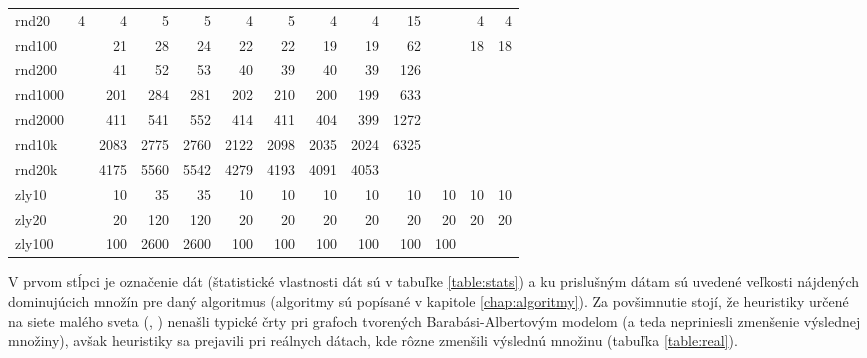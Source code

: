 \begin{landscape}
\begin{table}[h]
{\begin{tabular}{l|rrrrrrrrrrrr}
		rnd20   & 4     & 4      & 5       & 5        & 4        & 5        & 4       & 4      & 15         &            & 4      & 4       \\
		rnd100  &       & 21     & 28      & 24       & 22       & 22       & 19      & 19     & 62         &            & 18     & 18      \\
		rnd200  &       & 41     & 52      & 53       & 40       & 39       & 40      & 39     & 126        &            &        &         \\
		rnd1000 &       & 201    & 284     & 281      & 202      & 210      & 200     & 199    & 633        &            &        &         \\
		rnd2000 &       & 411    & 541     & 552      & 414      & 411      & 404     & 399    & 1272       &            &        &         \\
		rnd10k  &       & 2083   & 2775    & 2760     & 2122     & 2098     & 2035    & 2024   & 6325       &            &        &         \\
		rnd20k  &       & 4175   & 5560    & 5542     & 4279     & 4193     & 4091    & 4053   &            &            &        &         \\
		zly10   &       & 10     & 35      & 35       & 10       & 10       & 10      & 10     & 10         & 10         & 10     & 10      \\
		zly20   &       & 20     & 120     & 120      & 20       & 20       & 20      & 20     & 20         & 20         & 20     & 20      \\
		zly100  &       & 100    & 2600    & 2600     & 100      & 100      & 100     & 100    & 100        & 100        &        &         \\ \hline
	\end{tabular}
}
	\smallskip \par
	{\footnotesize 
	V prvom stĺpci je označenie dát (štatistické vlastnosti dát sú v tabuľke 
	\ref{table:stats}) a ku prislušným dátam sú uvedené veľkosti nájdených 
	dominujúcich množín pre daný algoritmus (algoritmy sú popísané v kapitole 
	\ref{chap:algoritmy}). Za povšimnutie stojí, že 
	heuristiky určené na siete malého sveta (, ) 
	nenašli typické črty pri grafoch tvorených Barabási-Albertovým modelom 
	(a teda nepriniesli zmenšenie výslednej množiny), 	avšak heuristiky sa 
	prejavili pri reálnych dátach, kde rôzne zmenšili výslednú množinu 
	(tabuľka \ref{table:real}).}
	\label{table:size}
\end{table}

\end{landscape}

